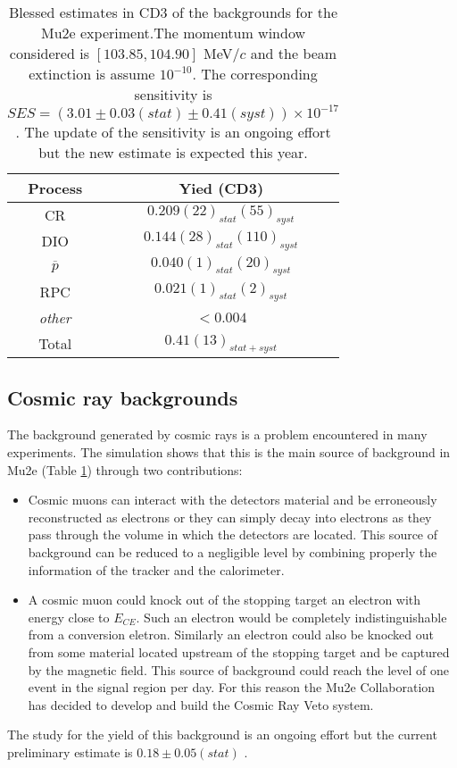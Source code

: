 \documentclass[12pt,a4paper,openright, oneside, titlepage]{book} %
\begin{document}
\begin{table}
\centering
\begin{tabular}{|c|c|}
\hline
Process & Yied (CD3)\\
\hline
\hline
CR	&	$0.209(22)_{stat}(55)_{syst}$ \\
\hline
DIO	&	$0.144(28)_{stat}(110)_{syst}$ \\
\hline
$\overline{p}$	&	$0.040(1)_{stat}(20)_{syst}$ \\
\hline
RPC	&	$0.021(1)_{stat}(2)_{syst}$	 \\
\hline
\textit{other}	& $< 0.004$ \\
\hline
\hline
Total &	$0.41(13)_{stat+syst}$ \\
\hline
\end{tabular}
\caption{Blessed estimates in CD3 \cite{CD3} of the backgrounds for the Mu2e experiment.The momentum window considered is $[103.85, 104.90]$ MeV$/c$ and the beam extinction is assume $10^{-10}$. The corresponding sensitivity is $SES=(3.01 \pm 0.03(stat) \pm 0.41(syst)) \times 10^{-17}$. The update of the sensitivity is an ongoing effort but the new estimate is expected this year.}
\label{T_backgrounds}
\end{table}

\subsection{Cosmic ray backgrounds}
The background generated by cosmic rays is a problem encountered in many experiments.
The simulation shows that this is the main source of background in Mu2e (Table \ref{T_backgrounds})
through two contributions:

\begin{itemize}
\item Cosmic muons can interact with the detectors material and be erroneously 
reconstructed as electrons or they can simply decay into electrons as they pass through 
the volume in which the detectors are located. This source
of background can be reduced to a negligible level by combining properly the information
of the tracker and the calorimeter.
 \item A cosmic muon could knock out of the stopping target an electron 
 with energy close to $E_{CE}$. 
 Such an electron would be completely indistinguishable 
 from a conversion eletron. 
Similarly an electron could also be knocked out from some material located upstream
of the stopping target and be captured by the magnetic field. 
This source of background could reach the level of one event in the signal region per day.
For this reason the Mu2e Collaboration has decided to develop and build the Cosmic 
Ray Veto system.
\end{itemize}
The study for the yield of this background is an ongoing effort but the current preliminary estimate is $0.18\pm0.05(stat)$ \cite{CRV_now}.
\end{document}
